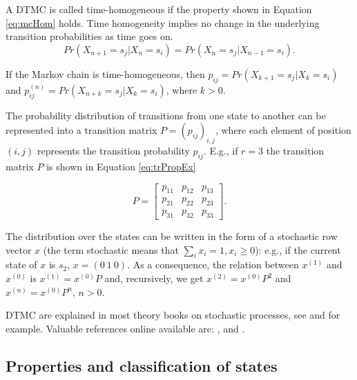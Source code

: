 \documentclass[article,nojss]{jss}
\begin{document}
A DTMC is called time-homogeneous if the property shown in Equation \ref{eq:mcHom} holds. Time homogeneity implies no change in the underlying transition probabilities as time goes on.
\begin{equation}
Pr\left(X_{n+1}=s_{j}\left|X_{n}=s_{i}\right.\right)=Pr\left(X_{n}=s_{j}\left|X_{n-1}=s_{i}\right.\right).
\label{eq:mcHom}
\end{equation}

If the Markov chain is time-homogeneous, then \(p_{ij}=Pr\left(X_{k+1}=s_{j}\left|X_{k}=s_{i}\right.\right)\) and \newline \(p_{ij}^{(n)}=Pr\left(X_{n+k}=s_{j}\left|X_{k}=s_{i}\right.\right)\), where \(k>0\).

The probability distribution of transitions from one state to another can be represented into a transition matrix \(P=(p_{ij})_{i,j}\), where each element of position \((i,j)\) represents the transition probability \(p_{ij}\). E.g., if \(r=3\) the transition matrix \(P\) is shown in Equation \ref{eq:trPropEx}

\begin{equation}
P=\left[\begin{array}{ccc}
p_{11} & p_{12} & p_{13}\\
p_{21} & p_{22} & p_{23}\\
p_{31} & p_{32} & p_{33}
\end{array}\right].
\label{eq:trPropEx}
\end{equation}

The distribution over the states can be written in the form of a stochastic row vector \(x\) (the term stochastic means that \(\sum_{i}x_{i}=1, x_{i} \geq 0\)): e.g., if the current state of \(x\) is \(s_{2}\), \(x=\left(0\:1\:0\right)\). As a consequence, the relation between \(x^{(1)}\) and \(x^{(0)}\) is \(x^{(1)}=x^{(0)}P\) and, recursively, we get \(x^{(2)}=x^{(0)}P^{2}\) and \(x^{(n)}=x^{(0)}P^{n},\, n>0\).

DTMC are explained in most theory books on stochastic processes, see \cite{bremaud1999discrete} and \cite{dobrow2016introduction} for example. Valuable references online available are: \cite{konstantopoulos2009markov}, \cite{probBook} and \cite{bardPpt}.

\hypertarget{sec:properties}{%
\subsection{Properties and classification of states}\label{sec:properties}}
\end{document}
